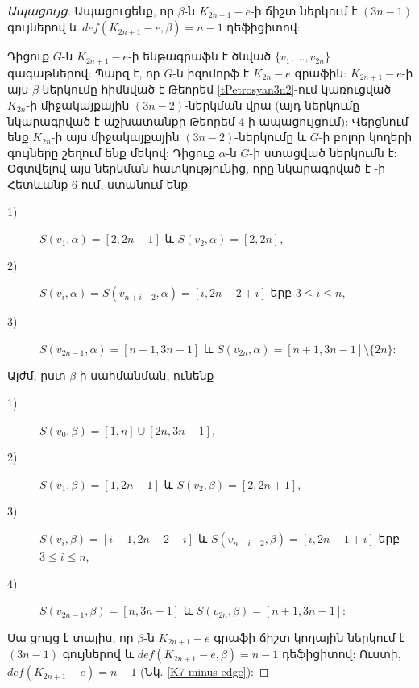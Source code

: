 \begin{proof}[Ապացույց]
Ապացուցենք, որ $\beta$-ն $K_{2n+1}-e$-ի ճիշտ ներկում է $(3n-1)$ գույներով և $def(K_{2n+1}-e,\beta)=n-1$ դեֆիցիտով:

Դիցուք $G$-ն $K_{2n+1}-e$-ի ենթագրաֆն է ծնված 
$\{v_{1},\ldots,v_{2n}\}$ գագաթներով: Պարզ է, որ $G$-ն իզոմորֆ է $K_{2n}-e$ գրաֆին:
$K_{2n+1}-e$-ի այս $\beta$ ներկումը հիմնված է Թեորեմ \ref{tPetrosyan3n2}-ում կառուցված $K_{2n}$-ի միջակայքային $(3n-2)$-ներկման վրա (այդ ներկումը նկարագրված է \cite{Petrosyan2010} աշխատանքի Թեորեմ 4-ի ապացույցում): %
Վերցնում ենք $K_{2n}$-ի այս միջակայքային $(3n-2)$-ներկումը և $G$-ի բոլոր կողերի գույները շեղում ենք մեկով: Դիցուք $\alpha$-ն $G$-ի ստացված ներկումն է: Օգտվելով այս ներկման հատկությունից, որը նկարագրված է \cite{Petrosyan2010}-ի Հետևանք 6-ում, ստանում ենք %

\begin{description}
\item[1)] $S\left(v_{1},\alpha\right)=[2,2n-1]$ և $S\left(v_{2},\alpha\right)=[2,2n]$,

\item[2)] $S\left(v_{i},\alpha\right)=S\left(v_{n+i-2},\alpha\right)=[i,2n-2+i]$ երբ $3\leq i\leq n$,

\item[3)]
$S\left(v_{2n-1},\alpha\right)=[n+1,3n-1]$ և
$S\left(v_{2n},\alpha\right)=[n+1,3n-1]\setminus\{2n\}$:
\end{description}

Այժմ, ըստ $\beta$-ի սահմանման, ունենք

\begin{description}
\item[1)] $S\left(v_{0},\beta\right)=[1,n]\cup [2n,3n-1]$,

\item[2)] $S\left(v_{1},\beta\right)=[1,2n-1]$ և $S\left(v_{2},\beta\right)=[2,2n+1]$,

\item[3)] $S\left(v_{i},\beta\right)=[i-1,2n-2+i]$ և $S\left(v_{n+i-2},\beta\right)=[i,2n-1+i]$ երբ $3\leq i\leq n$,

\item[4)]
$S\left(v_{2n-1},\beta\right)=[n,3n-1]$ և
$S\left(v_{2n},\beta\right)=[n+1,3n-1]$:
\end{description}

Սա ցույց է տալիս, որ $\beta$-ն $K_{2n+1}-e$ գրաֆի ճիշտ կողային ներկում է $(3n-1)$ գույներով և $def(K_{2n+1}-e,\beta)=n-1$ դեֆիցիտով: Ուստի,
$def(K_{2n+1}-e)=n-1$ (Նկ. \ref{K7-minus-edge}):
\end{proof}

